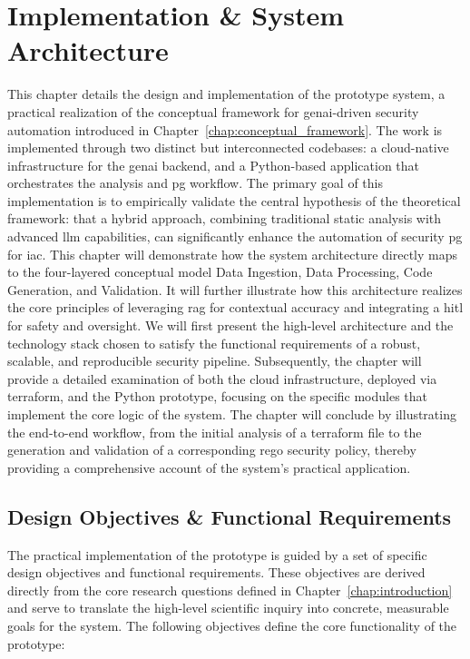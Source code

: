 \chapter{Implementation \& System Architecture}
\label{chap:implementation}

This chapter details the design and implementation of the prototype system, a practical realization of the conceptual framework for \gls{genai}-driven security automation introduced in Chapter~\ref{chap:conceptual_framework}. The work is implemented through two distinct but interconnected codebases: a \gls{cloud-native} infrastructure for the \gls{genai} backend, and a Python-based application that orchestrates the analysis and \gls{pg} workflow. The primary goal of this implementation is to empirically validate the central hypothesis of the theoretical framework: that a hybrid approach, combining traditional static analysis with advanced \gls{llm} capabilities, can significantly enhance the automation of security \gls{pg} for \gls{iac}. This chapter will demonstrate how the system architecture directly maps to the four-layered conceptual model Data Ingestion, Data Processing, Code Generation, and Validation. It will further illustrate how this architecture realizes the core principles of leveraging \gls{rag} for contextual accuracy and integrating a \gls{hitl} for safety and oversight. We will first present the high-level architecture and the technology stack chosen to satisfy the functional requirements of a robust, scalable, and reproducible security pipeline. Subsequently, the chapter will provide a detailed examination of both the cloud infrastructure, deployed via \gls{terraform}, and the Python prototype, focusing on the specific modules that implement the core logic of the system. The chapter will conclude by illustrating the end-to-end workflow, from the initial analysis of a \gls{terraform} file to the generation and validation of a corresponding \gls{rego} security policy, thereby providing a comprehensive account of the system's practical application.

\section{Design Objectives \& Functional Requirements}

The practical implementation of the prototype is guided by a set of specific design objectives and functional requirements. These objectives are derived directly from the core research questions defined in Chapter~\ref{chap:introduction} and serve to translate the high-level scientific inquiry into concrete, measurable goals for the system. The following objectives define the core functionality of the prototype:

